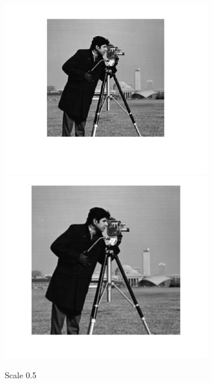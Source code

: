 \documentclass{article}
\begin{document}
\begin{figure}[h!]
	\centering
	\begin{subfigure}[t]{0.3\textwidth}
		\centering
		\includegraphics[width=\linewidth]{./output_images/DOWN_anti-alias_cubic_scale_0_500000.png}
		\includegraphics[width=\linewidth]{./output_images/UP_anti-alias_cubic_scale_0_500000.png}
		\caption{Scale 0.5}
	\end{subfigure}%
	~
	\begin{subfigure}[t]{0.3\textwidth}

\end{subfigure}
\end{figure}
\end{document}
